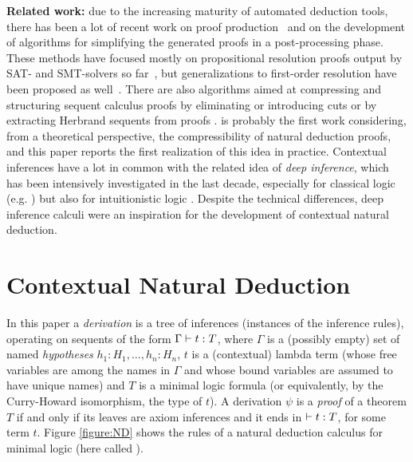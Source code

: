 \documentclass{llncs}
\begin{document}
\noindent\textbf{Related work:} due to the increasing maturity of automated deduction tools, there has been a lot of recent work on proof production~\cite{APPABook} and on the development of algorithms for simplifying the generated proofs in a post-processing phase. These methods have focused mostly on propositional resolution proofs output by SAT- and SMT-solvers so far~\cite{RP,RPILU,LUniv,RedRec,Split,Skeptik}, 
but generalizations to first-order resolution have been proposed as well~\cite{FOLU}. 
There are also algorithms aimed at compressing and structuring sequent calculus proofs by eliminating or introducing cuts \cite{Woltzenlogel-Paleo2010Atomic-Cut-Introduction-by-Resolution:-Proof-Structuring-and-Compression,HetzlLeitschWeller2012Towards-Algorithmic-Cut-Introduction,RedundancyInCutElimination,PhDThesis} or by extracting Herbrand sequents from proofs \cite{HerbrandSequent,HerbrandSequentThesis,HerbrandSequentBook}. 
\cite{NDc} is probably the first work considering, from a theoretical perspective, the compressibility of natural deduction proofs, and this paper reports the first realization of this idea in practice. Contextual inferences have a lot in common with the related idea of \emph{deep inference}, which has been intensively investigated in the last decade, especially for classical logic (e.g. \cite{Brunnler2003Atomic-Cut-Elimination-for-classical-Logic,BruscoliGuglielmiGundersenParigot2010A-Quasipolynomial-Cut-Elimination-Procedure-in-Deep-Inference-via-Atomic-Flows-and-Threshold-Formulae,BruscoliGuglielmi2009On-the-Proof-Complexity-of-Deep-Inference,Guglielmi1999A-System-of-Interaction-and-Structure}) but also for intuitionistic logic \cite{Tiu2006A-Local-System-for-Intuitionistic-Logic,BruennlerMcKinley2008An-Algorithmic-Interpretation-of-a-Deep-Inference-System,Guenot2011Nested-proof-search-as-reduction-in-the-Lambda-calculus}. Despite the technical differences, deep inference calculi were an inspiration for the development of contextual natural deduction.



\section{Contextual Natural Deduction}
\label{section:DeepND}

\newcommand{\CurryHoward}{\mathcal{I}}
\newcommand{\C}{\mathcal{C}}

In this paper a \emph{derivation} is a tree of inferences (instances of the inference rules), operating on sequents of the form $\Gamma \vdash t: T$, where $\Gamma$ is a (possibly empty) set of named \emph{hypotheses} $h_1: H_1, \ldots, h_n: H_n$, $t$ is a (contextual) lambda term (whose free variables are among the names in $\Gamma$ and whose bound variables are assumed to have unique names) and $T$ is a minimal logic formula (or equivalently, by the Curry-Howard isomorphism, the type of $t$). A derivation $\psi$ is a \emph{proof} of a theorem $T$ if and only if its leaves are axiom inferences and it ends in $\vdash t: T$, for some term $t$. Figure \ref{figure:ND} shows the rules of a natural deduction calculus for minimal logic (here called {\ND}). 
\end{document}
